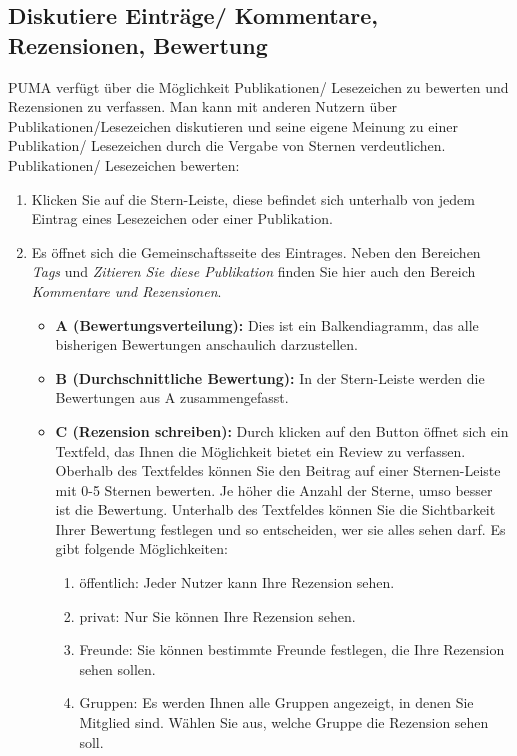 \subsection{Diskutiere Einträge/ Kommentare, Rezensionen, Bewertung}
PUMA verfügt über die Möglichkeit Publikationen/ Lesezeichen zu bewerten und Rezensionen zu verfassen. Man kann mit anderen Nutzern über Publikationen/Lesezeichen diskutieren und seine eigene Meinung zu einer Publikation/ Lesezeichen durch die Vergabe von Sternen verdeutlichen.
\newline
\newline
Publikationen/ Lesezeichen bewerten:
\begin{enumerate}
    \item Klicken Sie auf die Stern-Leiste, diese befindet sich unterhalb von jedem Eintrag eines Lesezeichen oder einer Publikation.  
    \item Es öffnet sich die Gemeinschaftsseite des Eintrages. Neben den Bereichen \textit{Tags} und \textit{Zitieren Sie diese Publikation} finden Sie hier auch den Bereich \textit{Kommentare und Rezensionen}. 
    \begin{itemize} %
        \item \textbf{A (Bewertungsverteilung):} Dies ist ein Balkendiagramm, das alle bisherigen Bewertungen anschaulich darzustellen. %
        \item \textbf{B (Durchschnittliche Bewertung):} In der Stern-Leiste  werden die Bewertungen aus A zusammengefasst.
        \item \textbf{C (Rezension schreiben):} Durch klicken auf den Button öffnet sich ein Textfeld, das Ihnen die Möglichkeit bietet ein Review  zu verfassen. Oberhalb des Textfeldes können Sie den Beitrag auf einer Sternen-Leiste mit 0-5 Sternen bewerten. Je höher die Anzahl der Sterne, umso besser ist die Bewertung. Unterhalb des Textfeldes können Sie die Sichtbarkeit Ihrer Bewertung festlegen und so entscheiden, wer sie alles sehen darf. Es gibt folgende Möglichkeiten:
        \begin{enumerate}
            \item öffentlich: Jeder Nutzer kann Ihre Rezension sehen.
            \item privat: Nur Sie können Ihre Rezension sehen.
            \item Freunde: Sie können bestimmte Freunde festlegen, die Ihre Rezension sehen sollen.
            \item Gruppen: Es werden Ihnen alle Gruppen angezeigt, in denen Sie Mitglied sind. Wählen Sie aus, welche Gruppe die Rezension sehen soll.

\end{enumerate}
\end{itemize}
\end{enumerate}
